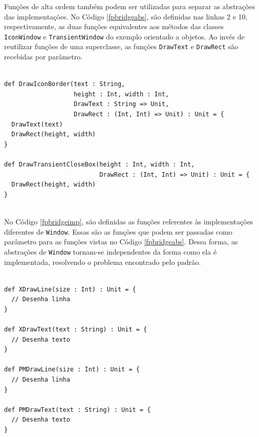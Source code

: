 Funções de alta ordem também podem ser utilizadas 
para separar as abstrações das implementações. 
No Código \ref{fpbridgeabs}, são definidas nas 
linhas 2 e 10, respectivamente, as 
duas funções equivalentes aos métodos das 
classes \texttt{IconWindow} e \texttt{TransientWindow} do exemplo 
orientado a objetos. Ao invés de reutilizar 
funções de uma superclasse, as funções 
\texttt{DrawText} e \texttt{DrawRect} são recebidas por parâmetro.

\begin{lstlisting}[caption={Abstrações no \textit{Bridge} Funcional.},label=fpbridgeabs]
    
def DrawIconBorder(text : String,
                   height : Int, width : Int,
                   DrawText : String => Unit,
                   DrawRect : (Int, Int) => Unit) : Unit = {
  DrawText(text)
  DrawRect(height, width)
}

def DrawTransientCloseBox(height : Int, width : Int,
                          DrawRect : (Int, Int) => Unit) : Unit = {
  DrawRect(height, width)
}
    
\end{lstlisting}

No Código \ref{fpbridgeimp}, são definidas as 
funções referentes às implementações diferentes 
de \texttt{Window}. Essas são as funções que podem ser 
passadas como parâmetro para as funções vistas 
no Código \ref{fpbridgeabs}. Dessa forma, as 
abstrações de \texttt{Window} tornam-se independentes 
da forma como ela é implementada, resolvendo 
o problema encontrado pelo padrão.

\begin{lstlisting}[caption={Implementações no \textit{Bridge} Funcional.},label=fpbridgeimp]
    
def XDrawLine(size : Int) : Unit = {
  // Desenha linha
}

def XDrawText(text : String) : Unit = {
  // Desenha texto
}

def PMDrawLine(size : Int) : Unit = {
  // Desenha linha
}

def PMDrawText(text : String) : Unit = {
  // Desenha texto
}
    
\end{lstlisting}

